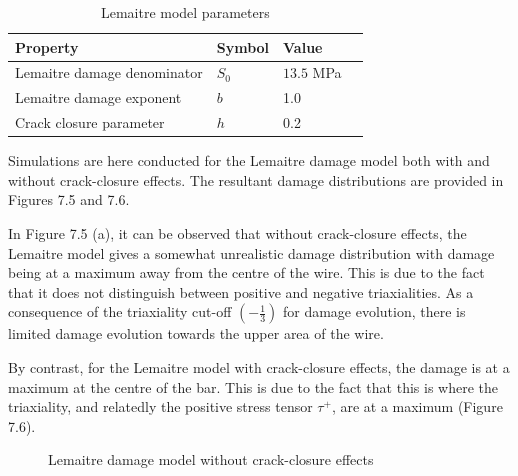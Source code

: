 \documentclass[sn-mathphys,Numbered,draft]{sn-jnl}%
\begin{document}
\begin{table}[htb]
	\centering
		\begin{tabular}{llll} \hline
			Property & Symbol & Value  \\ \hline 
			Lemaitre damage denominator & $S_0$ & $13.5$ MPa  \\
			Lemaitre damage exponent & $b$ & 1.0  \\
            Crack closure parameter & $h$ & 0.2 \\
			\hline
		\end{tabular}
	\caption{Lemaitre model parameters}
	\label{tab:material_properties}
\end{table}

Simulations are here conducted for the Lemaitre damage model both with and without crack-closure effects. The resultant damage distributions are provided in Figures 7.5 and 7.6. 

In Figure 7.5 (a), it can be observed that without crack-closure effects, the Lemaitre model gives a somewhat unrealistic damage distribution with damage being at a maximum away from the centre of the wire. This is due to the fact that it does not distinguish between positive and negative triaxialities.  As a consequence of the triaxiality cut-off  $\left(-\frac{1}{3}\right)$ for damage evolution, there is limited damage evolution towards the upper area of the wire.

By contrast, for the Lemaitre model with crack-closure effects, the damage is at a maximum at the centre of the bar. This is due to the fact that this is where the triaxiality, and relatedly the positive stress tensor $\tau^+$, are at a maximum (Figure 7.6). 

\begin{figure}[t!]
	\centering
	  \qquad
		
		\caption{Lemaitre damage model without crack-closure effects}
	\label{label_for_entire_figure}
\end{figure}
\FloatBarrier
\end{document}
